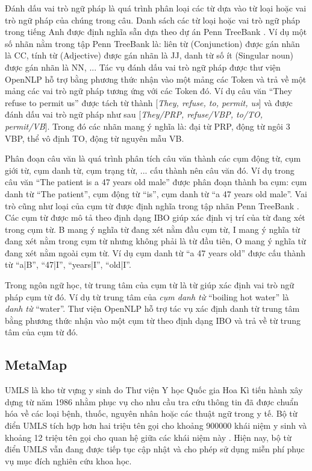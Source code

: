 Đánh dấu vai trò ngữ pháp là quá trình phân loại các từ dựa vào từ loại hoặc vai trò ngữ pháp của chúng trong câu. Danh sách các từ loại hoặc vai trò ngữ pháp trong tiếng Anh được định nghĩa sẵn dựa theo dự án Penn TreeBank \cite{Santorini1990}. Ví dụ một số nhãn nằm trong tập Penn TreeBank là: liên từ (Conjunction) được gán nhãn là CC, tính từ (Adjective) được gán nhãn là JJ, danh từ số ít (Singular noun) được gán nhãn là NN, ... Tác vụ đánh dấu vai trò ngữ pháp được thư viện OpenNLP hỗ trợ bằng phương thức nhận vào một mảng các Token và trả về một mảng các vai trò ngữ pháp tương ứng với các Token đó. Ví dụ câu văn ``They refuse to permit us'' được tách từ thành [\textit{They, refuse, to, permit, us}] và được đánh dấu vai trò ngữ pháp như sau [\textit{They/PRP, refuse/VBP, to/TO, permit/VB}]. Trong đó các nhãn mang ý nghĩa là: đại từ PRP, động từ ngôi 3 VBP, thể vô định TO, động từ nguyên mẫu VB.

Phân đoạn câu văn là quá trình phân tích câu văn thành các cụm động từ, cụm giới từ, cụm danh từ, cụm trạng từ, ... cấu thành nên câu văn đó. Ví dụ trong câu văn ``The patient is a 47 years old male'' được phân đoạn thành ba cụm: cụm danh từ ``The patient'', cụm động từ ``is'', cụm danh từ ``a 47 years old male''. Vai trò cũng như loại của cụm từ được định nghĩa trong tập nhãn Penn TreeBank \cite{Santorini1990}. Các cụm từ được mô tả theo định dạng IBO giúp xác định vị trí của từ  đang xét trong cụm từ. B mang ý nghĩa từ đang xét nằm đầu cụm từ, I mang ý nghĩa từ đang xét nằm trong cụm từ nhưng không phải là từ đầu tiên, O mang ý nghĩa từ đang xét nằm ngoài cụm từ. Ví dụ cụm danh từ ``a 47 years old'' được cấu thành từ ``a|B'', ``47|I'', ``years|I'', ``old|I''.

Trong ngôn ngữ học, từ trung tâm của cụm từ là từ giúp xác định vai trò ngữ pháp cụm từ đó. Ví dụ từ trung tâm của \textit{cụm danh từ} ``boiling hot water'' là \textit{danh từ} ``water''. Thư viện OpenNLP hỗ trợ tác vụ xác định danh từ trung tâm bằng phương thức nhận vào một cụm từ theo định dạng IBO và trả về từ trung tâm của cụm từ đó.

\subsection*{MetaMap}
UMLS là kho từ vựng y sinh do Thư viện Y học Quốc gia Hoa Kì tiến hành xây dựng từ năm 1986 nhằm phục vụ cho nhu cầu tra cứu thông tin đã được chuẩn hóa về các loại bệnh, thuốc, nguyên nhân hoặc các thuật ngữ trong y tế. Bộ từ điển UMLS tích hợp hơn hai triệu tên gọi cho khoảng 900000 khái niệm y sinh và khoảng 12 triệu tên gọi cho quan hệ giữa các khái niệm này \cite{Olivier2004}. Hiện nay, bộ từ điển UMLS vẫn đang được tiếp tục cập nhật và cho phép sử dụng miễn phí phục vụ mục đích nghiên cứu khoa học.

